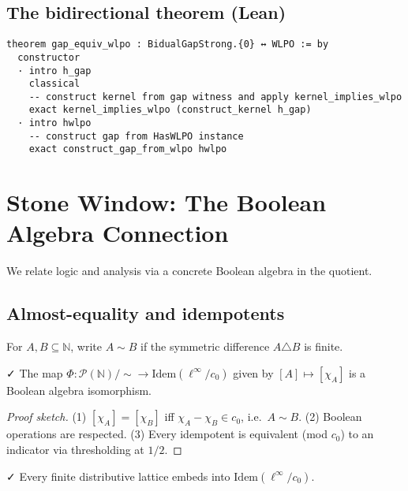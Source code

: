 \documentclass{lmcs}
\newcommand{\leanok}{\textsf{\small \textcolor{green!70!black}{✓}}}
\newcommand{\N}{\mathbb{N}}
\newcommand{\linf}{\ell^\infty}
\newcommand{\cnull}{c_0}
\begin{document}
\subsection{The bidirectional theorem (Lean)}

\begin{lstlisting}[caption={WLPO ↔ Gap (top-level equivalence)}]
theorem gap_equiv_wlpo : BidualGapStrong.{0} ↔ WLPO := by
  constructor
  · intro h_gap
    classical
    -- construct kernel from gap witness and apply kernel_implies_wlpo
    exact kernel_implies_wlpo (construct_kernel h_gap)
  · intro hwlpo
    -- construct gap from HasWLPO instance
    exact construct_gap_from_wlpo hwlpo
\end{lstlisting}

\section{Stone Window: The Boolean Algebra Connection}\label{sec:stone}

We relate logic and analysis via a concrete Boolean algebra in the quotient.

\subsection{Almost-equality and idempotents}

\begin{defi}
For $A,B\subseteq\N$, write $A\sim B$ if the symmetric difference $A\triangle B$ is finite.
\end{defi}

\begin{thm}\label{thm:stone}\leanok
The map $\Phi:\mathcal{P}(\N)/{\sim}\to \mathrm{Idem}(\linf/\cnull)$ given by $[A]\mapsto [\chi_A]$ is a Boolean algebra isomorphism.
\end{thm}

\begin{proof}[Proof sketch]
(1) $[\chi_A]=[\chi_B]$ iff $\chi_A-\chi_B\in \cnull$, i.e.\ $A\sim B$.  
(2) Boolean operations are respected.  
(3) Every idempotent is equivalent (mod $\cnull$) to an indicator via thresholding at $1/2$.
\end{proof}

\begin{cor}\leanok
Every finite distributive lattice embeds into $\mathrm{Idem}(\linf/\cnull)$.
\end{cor}
\end{document}
